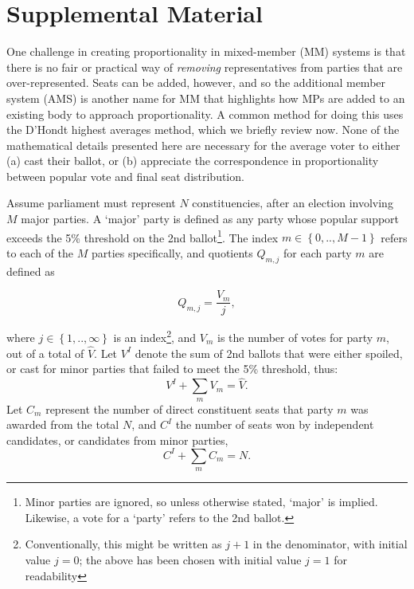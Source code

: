 
\clearpage
\renewcommand{\theequation}{S.\arabic{equation}}
\renewcommand{\thesection}{S.\arabic{section}}
\setcounter{section}{0}
\setcounter{equation}{0}

\section*{Supplemental Material}

One challenge in creating proportionality in mixed-member (MM) systems is that there is no fair or practical way of \emph{removing} representatives from parties that are over-represented. 
Seats can be added, however, and so the additional member system (AMS) is another name for MM that highlights how MPs are added to an existing body to approach proportionality. 
A common method for doing this uses the D'Hondt highest averages method, which we briefly review now. None of the mathematical details presented here are necessary for the average voter to either (a) cast their ballot, or (b) appreciate the correspondence in proportionality between popular vote and final seat distribution.

Assume parliament must represent $N$ constituencies, after an election involving $M$ major parties. A `major' party is defined as any party whose popular support exceeds the 5\% threshold on the 2nd ballot\footnote{Minor parties are ignored, so unless otherwise stated, `major' is implied. Likewise, a vote for a `party' refers to the 2nd ballot.}. 
The index  $m \in \left\{0, .., M-1\right\} $  refers to each of the $M$ parties specifically, and quotients $Q_{m,j}$ for each party $m$ are defined as 

\begin{equation}
\label{eq:DhondtSupp}
Q_{m,j} = \frac{V_m}{j},
\end{equation}

where $j \in \left\{ 1,.., \infty \right\}$ is an index\footnote{Conventionally, this might be written as $j+1$ in the denominator, with initial value $j=0$; the above has been chosen with initial value $j=1$ for readability}, and  $V_m$ is the number of votes for party $m$, out of a total of $\hat{V}$. Let $V^I$ denote the sum of 2nd ballots that were either spoiled, or cast for minor parties that failed to meet the 5\% threshold, thus: 
\begin{equation}
\label{eq:sum_Vm}
V^I + \sum_m V_m = \hat{V}.
\end{equation}
Let $C_m$ represent the number of direct constituent seats that party $m$ was awarded from the total $N$, and $C^I$ the number of seats won by independent candidates, or candidates from minor parties,
\begin{equation}
\label{eq:sum_Cm}
C^I + \sum_m C_m = N.
\end{equation}

